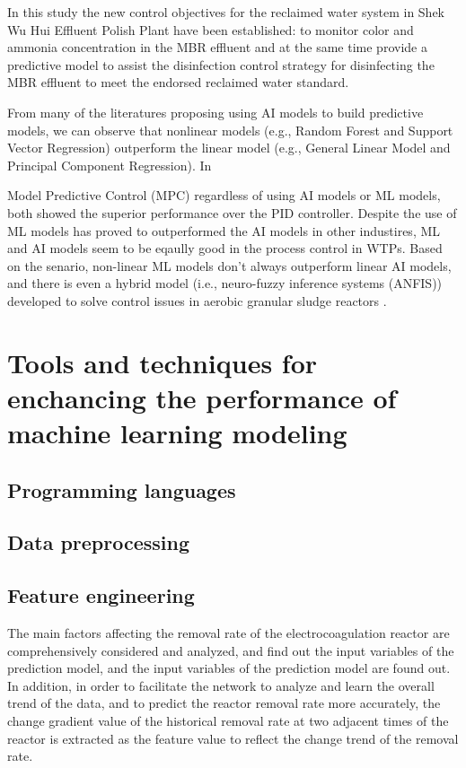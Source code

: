 In this study the new control objectives for the reclaimed water system in Shek Wu Hui Effluent Polish Plant have been established: to monitor color and ammonia concentration in the MBR effluent and at the same time provide a predictive model to assist the disinfection control strategy for disinfecting the MBR effluent to meet the endorsed reclaimed water standard.

From many of the literatures proposing using AI models to build predictive models, we can observe that nonlinear models (e.g., Random Forest and Support Vector Regression) outperform the linear model (e.g., General Linear Model and Principal Component Regression). In 

Model Predictive Control (MPC) regardless of using AI models or ML models, both showed the superior performance over the PID controller. Despite the use of ML models has proved to outperformed the AI models in other industires, ML and AI models seem to be eqaully good in the process control in WTPs. Based on the senario, non-linear ML models don't always outperform linear AI models, and there is even a hybrid model (i.e., neuro-fuzzy inference systems (ANFIS)) developed to solve control issues in aerobic granular sludge reactors \citep{zaghloulDevelopmentEnsembleMachine2021}.
\section{Tools and techniques for enchancing the performance of machine learning modeling}
\subsection{Programming languages}
\subsection{Data preprocessing}

\subsection{Feature engineering}
The main factors affecting the removal rate of the electrocoagulation reactor are comprehensively considered and analyzed, and find out the input variables of the prediction model, and the input variables of the prediction model are found out. In addition, in order to facilitate the network to analyze and learn the overall trend of the data, and to predict the reactor removal rate more accurately, the change gradient value of the historical removal rate at two adjacent times of the reactor is extracted as the feature value to reflect the change trend of the removal rate. \citep{zaghloulDevelopmentEnsembleMachine2021}

